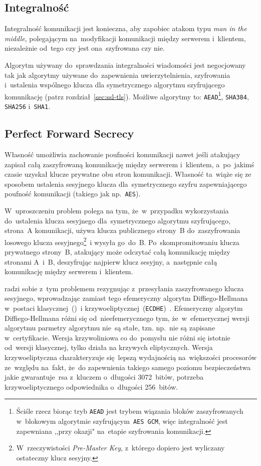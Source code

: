 \documentclass[thesis]{subfiles}
\begin{document}
\subsection{Integralność}

Integralność komunikacji jest konieczna, aby zapobiec atakom typu \emph{man in the middle}, polegającym na~modyfikacji komunikacji między serwerem i~klientem, niezależnie od~tego czy jest ona~szyfrowana czy nie.

Algorytm używany do~sprawdzania integralności wiadomości jest negocjowany tak jak algorytmy używane do~zapewnienia uwierzytelnienia, szyfrowania i~ustalenia wspólnego klucza dla symetrycznego algorytmu szyfrującego komunikację (patrz rozdział~\ref{sec:ssl-tls}). Możliwe algorytmy to: \texttt{AEAD}\footnote{Ściśle rzecz biorąc tryb \texttt{AEAD} jest trybem wiązania bloków zaszyfrowanych w~blokowym algorytmie szyfrującym~\texttt{AES~GCM}, więc integralność jest zapewniana ,,przy okazji" na~etapie szyfrowania komunikacji.}, \texttt{SHA384}, \texttt{SHA256} i~\texttt{SHA1}.

\subsection{Perfect Forward Secrecy}
\label{sec:pfs}

Własność  umożliwia zachowanie poufności komunikacji nawet jeśli atakujący zapisał całą zaszyfrowaną komunikację między serwerem i~klientem, a~po~jakimś czasie uzyskał klucze prywatne obu stron komunikacji. Własność ta~wiąże się ze sposobem ustalenia sesyjnego klucza dla~symetrycznego szyfru zapewniającego poufność komunikacji (takiego jak np.~\texttt{AES}).

W~uproszczeniu problem polega na tym, że~w~przypadku wykorzystania~ do~ustalenia klucza sesyjnego dla~symetrycznego algorytmu szyfrującego, strona~A komunikacji, używa klucza publicznego strony~B do~zaszyfrowania losowego klucza sesyjnego\footnote{W~rzeczywistości \emph{Pre-Master Key}, z~którego dopiero jest wyliczany ostateczny klucz sesyjny.}~i wysyła go~do~B. Po~skompromitowaniu klucza prywatnego strony~B, atakujący może odczytać całą komunikację między stronami A~i~B, deszyfrując najpierw klucz sesyjny, a~następnie całą komunikację między serwerem i~klientem.

 radzi sobie z~tym problemem rezygnując z~przesyłania zaszyfrowanego klucza sesyjnego, wprowadzając zamiast tego efemeryczny algorytm Diffiego-Hellmana w~postaci klasycznej~()~i krzywoeliptycznej~(\texttt{ECDHE})~\cite{mimuw-ssl-w04,openssl-cookbook-suites}. Efemeryczny algorytm Diffiego-Hellmana różni się od~nieefemerycznego tym, że~w~efemerycznej wersji algorytmu parmetry algorytmu nie~są stałe, tzn. np.~nie są zapisane w~certyfikacie. Wersja krzywoliniowa co do~pomysłu nie różni się istotnie od~wersji klasycznej, tylko działa na krzywych eliptycznych. Wersja krzywoeliptyczna charakteryzuje się~lepszą wydajnością na~większości procesorów ze~względu na~fakt, że~do zapewnienia takiego samego poziomu bezpieczeństwa jakie gwarantuje~\gls{rsa} z~kluczem o~długości 3072~bitów, potrzeba krzywoeliptycznego odpowiednika o~długości 256~bitów.
\end{document}
